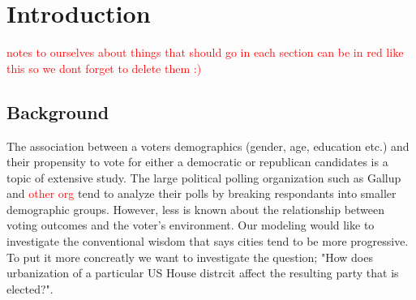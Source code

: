 \documentclass[12pt]{article}
\begin{document}









\section{Introduction}


\textcolor{red}{notes to ourselves about things that should go in each section can be in red like this so we dont forget to delete them :)}


\subsection{Background}
The association between a voters demographics (gender, age, education etc.) and their propensity to vote for either a democratic or republican candidates is a topic of extensive study. The large political polling organization such as Gallup and \textcolor{red}{other org} tend to analyze their polls by breaking respondants into smaller demographic groups. However, less is known about the relationship between voting outcomes and the voter's environment. Our modeling would like to investigate the conventional wisdom that says cities tend to be more progressive. To put it more concreatly we want to investigate the question; "How does urbanization of a particular US House distrcit affect the resulting party that is elected?". 
\end{document}
